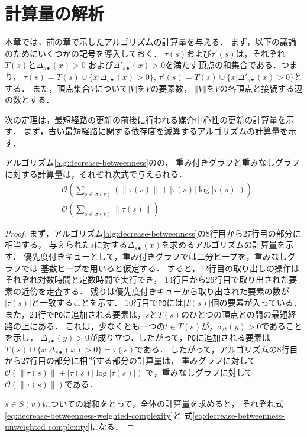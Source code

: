 \chapter{計算量の解析}
\label{chap:complexity-analysis}

本章では，前の章で示したアルゴリズムの計算量を与える．
まず，以下の議論のためにいくつかの記号を導入しておく．
$\tau(s)$および$\tau'(s)$は，それぞれ$T(s)$と$\Delta_{s\bullet}(x)>0$
および$\Delta'_{s\bullet}(x)>0$を満たす頂点の和集合である．つまり，
$\tau(s)=T(s)\cup\{x|\Delta_{s\bullet}(x)>0\}$,
$\tau'(s)=T(s)\cup\{x|\Delta'_{s\bullet}(x)>0\}$とする．
また，頂点集合$V$について$\left\vert V\right\vert$を$V$の要素数，
$\left\Vert V\right\Vert$を$V$の各頂点と接続する辺の数とする．

次の定理は，最短経路の更新の前後に行われる媒介中心性の更新の計算量を示す．
まず，古い最短経路に関する依存度を減算するアルゴリズムの計算量を示す．

\begin{theorem}
  \label{thm:decrease-betweenness-weight-complexity}
  アルゴリズム\ref{alg:decrease-betweenness}のの，
  重み付きグラフと重みなしグラフに対する計算量は，それぞれ次式で与えられる．
  \begin{align}
    &\mathcal{O}(\sum_{s\in S(v)}\left(\left\|\tau(s)\right\|+\left|\tau(s)\right|\log\left|\tau(s)\right|\right))
    \label{eq:decrease-betweenness-weighted-complexity} \\
    &\mathcal{O}(\sum_{s\in S(v)}\left\|\tau(s)\right\|)
    \label{eq:decrease-betweenness-unweighted-complexity}
  \end{align}
\end{theorem}
\begin{proof}
  まず，アルゴリズム\ref{alg:decrease-betweenness}の8行目から27行目の部分に相当する，
  与えられた$s$に対する$\Delta_{s\bullet}(x)$を求めるアルゴリズムの計算量を示す．
  優先度付きキューとして，重み付きグラフでは二分ヒープを，重みなしグラフでは
  基数ヒープを用いると仮定する．
  すると，12行目の取り出しの操作はそれぞれ対数時間と定数時間で実行でき，
  14行目から26行目で取り出された要素の近傍を走査する．
  残りは優先度付きキューから取り出された要素の数が$|\tau(s)|$と一致することを示す．
  10行目で\texttt{PQ}には$|T(s)|$個の要素が入っている．
  また，24行で\texttt{PQ}に追加される要素は，$s$と$T(s)$のひとつの頂点との間の最短経路の上にある．
  これは，少なくとも一つの$t\in T(s)$が，$\sigma_{st}(y)>0$であることを示し，
  $\Delta_{s\bullet}(y)>0$が成り立つ．したがって，\texttt{PQ}に追加される要素は
  $T(s)\cup\{x|\Delta_{s\bullet}(x)>0\}=\tau(s)$である．
  したがって，アルゴリズムの8行目から27行目の部分に相当する部分の計算量は，
  重みグラフに対して$\mathcal{O}(\|\tau(s)\|+|\tau(s)|\log|\tau(s)|)$
  で，重みなしグラフに対して$\mathcal{O}(\|\tau(s)\|)$である．

  $s\in S(v)$についての総和をとって，全体の計算量を求めると，
  それぞれ式\eqref{eq:decrease-betweenness-weighted-complexity}と
  式\eqref{eq:decrease-betweenness-unweighted-complexity}になる．
\end{proof}

